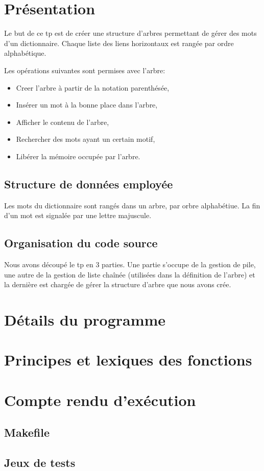 \documentclass{report}
\begin{document}
  
  \tableofcontents
  \setlength{\parskip}{10pt}
  \setlength{\parindent}{0pt}
  \chapter{Présentation}
    Le but de ce tp est de créer une structure d'arbres permettant de gérer des mots d'un dictionnaire. Chaque liste des liens horizontaux est rangée par ordre alphabétique.

    Les opérations suivantes sont permises avec l'arbre:
    \begin{itemize}
      \item Creer l'arbre à partir de la notation parenthésée,
      \item Insérer un mot à la bonne place dans l'arbre,
      \item Afficher le contenu de l'arbre,
      \item Rechercher des mots ayant un certain motif,
      \item Libérer la mémoire occupée par l'arbre.
    \end{itemize}

    \section{Structure de données employée}
      Les mots du dictionnaire sont rangés dans un arbre, par orbre alphabétiue. La fin d'un mot est signalée par une lettre majuscule.
    \section{Organisation du code source}
      Nous avons découpé le tp en 3 parties. Une partie s'occupe de la gestion de pile, une autre de la gestion de liste chaînée (utilisées dans la définition de l'arbre) et la dernière est chargée de gérer la structure d'arbre que nous avons crée.

      
  \chapter{Détails du programme}
    

  \chapter{Principes et lexiques des fonctions}
    

  \chapter{Compte rendu d'exécution}
    \section{Makefile}

    \section{Jeux de tests}
%      
\end{document}
